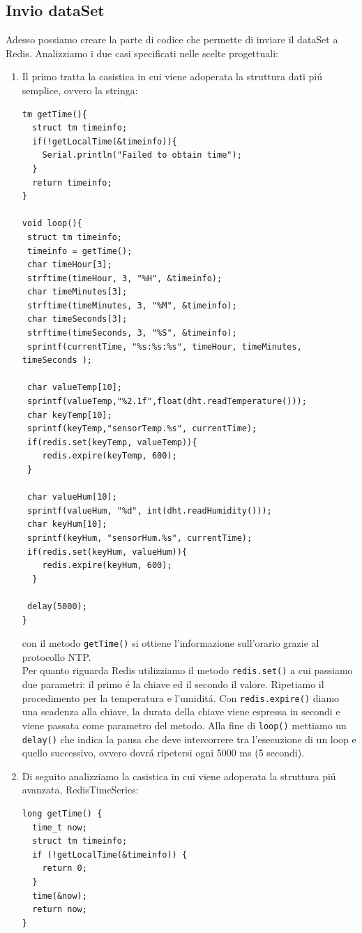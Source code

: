 \subsection{Invio dataSet}
Adesso possiamo creare la parte di codice che permette di inviare il dataSet a Redis.
Analizziamo i due casi specificati nelle scelte progettuali:
\begin{enumerate}
    \item Il primo tratta la casistica in cui viene adoperata la struttura dati piú semplice, ovvero la stringa:
\begin{lstlisting}[autogobble]
tm getTime(){
  struct tm timeinfo;
  if(!getLocalTime(&timeinfo)){
    Serial.println("Failed to obtain time");
  }
  return timeinfo;
}

void loop(){
 struct tm timeinfo;
 timeinfo = getTime();
 char timeHour[3];
 strftime(timeHour, 3, "%H", &timeinfo);
 char timeMinutes[3];
 strftime(timeMinutes, 3, "%M", &timeinfo);
 char timeSeconds[3];
 strftime(timeSeconds, 3, "%S", &timeinfo);
 sprintf(currentTime, "%s:%s:%s", timeHour, timeMinutes, timeSeconds );

 char valueTemp[10];
 sprintf(valueTemp,"%2.1f",float(dht.readTemperature()));
 char keyTemp[10];
 sprintf(keyTemp,"sensorTemp.%s", currentTime);
 if(redis.set(keyTemp, valueTemp)){
    redis.expire(keyTemp, 600);
 }

 char valueHum[10];
 sprintf(valueHum, "%d", int(dht.readHumidity()));
 char keyHum[10];
 sprintf(keyHum, "sensorHum.%s", currentTime);
 if(redis.set(keyHum, valueHum)){
    redis.expire(keyHum, 600);
  }

 delay(5000);
}\end{lstlisting}

con il metodo \texttt{getTime()} si ottiene l'informazione sull'orario grazie al protocollo NTP.\\
Per quanto riguarda Redis utilizziamo il metodo \texttt{redis.set()} a cui passiamo due parametri:
il primo é la chiave ed il secondo il valore. Ripetiamo il procedimento per la temperatura e l'umiditá.
Con \texttt{redis.expire()} diamo una scadenza alla chiave, la durata della chiave viene
espressa in secondi e viene passata come parametro del metodo.
Alla fine di \texttt{loop()} mettiamo un \texttt{delay()} che indica la pausa che deve intercorrere tra l'esecuzione
di un loop e quello successivo, ovvero dovrá ripetersi ogni 5000 ms (5 secondi).

    \item Di seguito analizziamo la casistica in cui viene adoperata la struttura piú avanzata, RedisTimeSeries:
\begin{lstlisting}[autogobble]
long getTime() {
  time_t now;
  struct tm timeinfo;
  if (!getLocalTime(&timeinfo)) {
    return 0;
  }
  time(&now);
  return now;
}


\end{lstlisting}
\end{enumerate}
